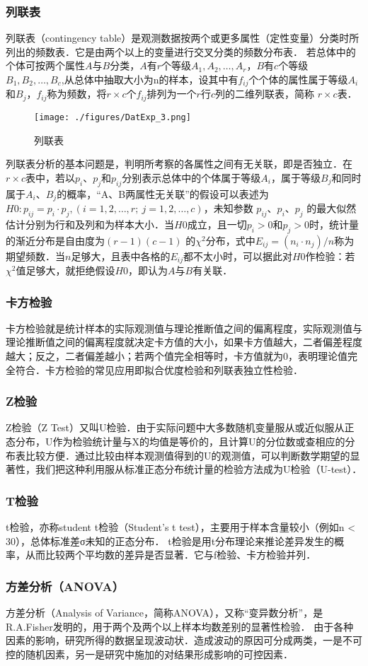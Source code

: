 \subsubsection{列联表}
列联表（contingency table）是观测数据按两个或更多属性（定性变量）分类时所列出的频数表．它是由两个以上的变量进行交叉分类的频数分布表．
若总体中的个体可按两个属性$A$与$B$分类，$A$有$r$个等级$A_1,A_2,\dots,A_r$，$B$有$c$个等级$B_1,B_2,\dots, B_c$,从总体中抽取大小为n的样本，设其中有$f_{ij}$个个体的属性属于等级$A_i$和$B_j$，$f_{ij}$称为频数，将$r\times c$个$f_{ij}$排列为一个$r$行$c$列的二维列联表，简称 $r\times c$表．
\begin{figure}[ht]
\centering
\texttt{[image: ./figures/DatExp\_3.png]}
\caption{列联表} \label{DatExp_fig3}
\end{figure}
列联表分析的基本问题是，判明所考察的各属性之间有无关联，即是否独立．在$r\times c$表中，若以$p_i$、$p_j$和$p_{ij}$分别表示总体中的个体属于等级$A_i$，属于等级$B_j$和同时属于$A_i$、$B_j$的概率，“A、B两属性无关联”的假设可以表述为$H0: p_{ij}=p_i\cdot p_j, (i=1,2,\dots, r; \ j=1,2,\dots,c)$，未知参数 $p_{ij}$、$p_i$、$p_j$ 的最大似然估计分别为行和及列和为样本大小．当$H0$成立，且一切$p_i>0$和$p_j>0$时，统计量的渐近分布是自由度为$(r-1)(c-1)$ 的$\chi^2$分布，式中$E_{ij}=(n_i \cdot n_j)/n$称为期望频数．当$n$足够大，且表中各格的$E_{ij}$都不太小时，可以据此对$H0$作检验：若$\chi^2$值足够大，就拒绝假设$H0$，即认为$A$与$B$有关联．

\subsubsection{卡方检验}
卡方检验就是统计样本的实际观测值与理论推断值之间的偏离程度，实际观测值与理论推断值之间的偏离程度就决定卡方值的大小，如果卡方值越大，二者偏差程度越大；反之，二者偏差越小；若两个值完全相等时，卡方值就为0，表明理论值完全符合．卡方检验的常见应用即拟合优度检验和列联表独立性检验．
\subsubsection{Z检验}
Z检验（Z Test）又叫U检验．由于实际问题中大多数随机变量服从或近似服从正态分布，U作为检验统计量与X的均值是等价的，且计算U的分位数或查相应的分布表比较方便．通过比较由样本观测值得到的U的观测值，可以判断数学期望的显著性，我们把这种利用服从标准正态分布统计量的检验方法成为U检验（U-test）．
\subsubsection{T检验}
t检验，亦称student t检验（Student's t test），主要用于样本含量较小（例如n < 30），总体标准差σ未知的正态分布． t检验是用t分布理论来推论差异发生的概率，从而比较两个平均数的差异是否显著．它与f检验、卡方检验并列．
\subsubsection{方差分析（ANOVA）}
方差分析（Analysis of Variance，简称ANOVA），又称“变异数分析”，是R.A.Fisher发明的，用于两个及两个以上样本均数差别的显著性检验． 由于各种因素的影响，研究所得的数据呈现波动状．造成波动的原因可分成两类，一是不可控的随机因素，另一是研究中施加的对结果形成影响的可控因素．


